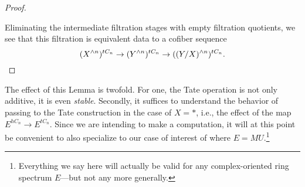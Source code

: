 \begin{proof}
\begin{center}
\end{center}
Eliminating the intermediate filtration stages with empty filtration quotients, we see that this filtration is equivalent data to a cofiber sequence \[(X^{\wedge n})^{tC_n} \to (Y^{\wedge n})^{tC_n} \to ((Y/X)^{\wedge n})^{tC_n}. \qedhere\]
\end{proof}

The effect of this Lemma is twofold.  For one, the Tate operation is not only additive, it is even \emph{stable}.  Secondly, it suffices to understand the behavior of passing to the Tate construction in the case of $X = *$, i.e., the effect of the map $E^{hC_n} \to E^{tC_n}$.  Since we are intending to make a computation, it will at this point be convenient to also specialize to our case of interest of where $E = MU$.\footnote{Everything we say here will actually be valid for any complex-oriented ring spectrum $E$---but not any more generally.}

